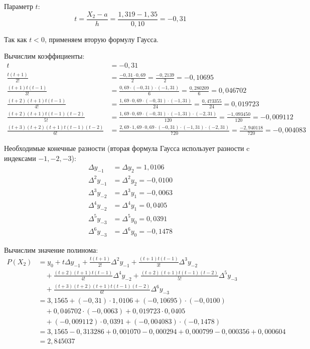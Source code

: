 Параметр $t$:
\[
t = \frac{X_2 - a}{h} = \frac{1{,}319 - 1{,}35}{0{,}10} = -0{,}31
\]

Так как $t < 0$, применяем вторую формулу Гаусса.

Вычислим коэффициенты:
\begin{align*}
t &= -0{,}31 \\
\frac{t(t+1)}{2!} &= \frac{-0{,}31 \cdot 0{,}69}{2} = \frac{-0{,}2139}{2} = -0{,}10695 \\
\frac{(t+1)t(t-1)}{3!} &= \frac{0{,}69 \cdot (-0{,}31) \cdot (-1{,}31)}{6} = \frac{0{,}280209}{6} = 0{,}046702 \\
\frac{(t+2)(t+1)t(t-1)}{4!} &= \frac{1{,}69 \cdot 0{,}69 \cdot (-0{,}31) \cdot (-1{,}31)}{24} = \frac{0{,}473355}{24} = 0{,}019723 \\
\frac{(t+2)(t+1)t(t-1)(t-2)}{5!} &= \frac{1{,}69 \cdot 0{,}69 \cdot (-0{,}31) \cdot (-1{,}31) \cdot (-2{,}31)}{120} = \frac{-1{,}093450}{120} = -0{,}009112 \\
\frac{(t+3)(t+2)(t+1)t(t-1)(t-2)}{6!} &= \frac{2{,}69 \cdot 1{,}69 \cdot 0{,}69 \cdot (-0{,}31) \cdot (-1{,}31) \cdot (-2{,}31)}{720} = \frac{-2{,}940118}{720} = -0{,}004083
\end{align*}

Необходимые конечные разности (вторая формула Гаусса использует разности c индексами $-1, -2, -3$):
\begin{align*}
\Delta y_{-1} &= \Delta y_2 = 1{,}0106 \\
\Delta^2 y_{-1} &= \Delta^2 y_2 = -0{,}0100 \\
\Delta^3 y_{-2} &= \Delta^3 y_1 = -0{,}0063 \\
\Delta^4 y_{-2} &= \Delta^4 y_1 = 0{,}0405 \\
\Delta^5 y_{-3} &= \Delta^5 y_0 = 0{,}0391 \\
\Delta^6 y_{-3} &= \Delta^6 y_0 = -0{,}1478
\end{align*}

Вычислим значение полинома:
\begin{align*}
P(X_2) &= y_0 + t\Delta y_{-1} + \frac{t(t+1)}{2!}\Delta^2 y_{-1} + \frac{(t+1)t(t-1)}{3!}\Delta^3 y_{-2} \\
&\quad + \frac{(t+2)(t+1)t(t-1)}{4!}\Delta^4 y_{-2} + \frac{(t+2)(t+1)t(t-1)(t-2)}{5!}\Delta^5 y_{-3} \\
&\quad + \frac{(t+3)(t+2)(t+1)t(t-1)(t-2)}{6!}\Delta^6 y_{-3} \\
&= 3{,}1565 + (-0{,}31) \cdot 1{,}0106 + (-0{,}10695) \cdot (-0{,}0100) \\
&\quad + 0{,}046702 \cdot (-0{,}0063) + 0{,}019723 \cdot 0{,}0405 \\
&\quad + (-0{,}009112) \cdot 0{,}0391 + (-0{,}004083) \cdot (-0{,}1478) \\
&= 3{,}1565 - 0{,}313286 + 0{,}001070 - 0{,}000294 + 0{,}000799 - 0{,}000356 + 0{,}000604 \\
&= 2{,}845037
\end{align*}

